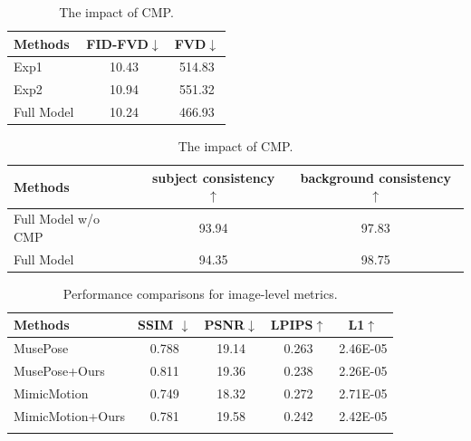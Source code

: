\begin{table}[t]
\footnotesize
\begin{minipage}[t]{0.33\textwidth}
\centering
\setlength{\tabcolsep}{2pt}
\caption{The impact of hybrid ControlNet.}
\begin{tabular}{lcc}
\toprule
{Methods} & FID-FVD$\downarrow$   & FVD$\downarrow$\\ 
\midrule
Exp1 & 10.43 & 514.83 \\
Exp2 & 10.94 & 551.32 \\
Full Model & 10.24 & 466.93 \\
 \bottomrule
\end{tabular}
\label{tab:appendix_controlnet}
\end{minipage}
\hfill
\begin{minipage}[t]{0.65\textwidth}
\caption{The impact of CMP.}
\centering
\setlength{\tabcolsep}{2pt}
\begin{tabular}{lcc}
\toprule[1pt]
Methods  & subject consistency$\uparrow$ & background consistency$\uparrow$ \\
\midrule
Full Model w/o CMP & 93.94                  &   97.83\\            
Full Model         &94.35                  &  98.75   \\
\bottomrule
\end{tabular}
\label{tab:appendix_cmp}
\end{minipage}
\end{table}

\begin{table}[t]
\caption{Performance comparisons for image-level metrics.}
\centering
\begin{tabular}{lcccc}
\toprule
Methods  & SSIM $\downarrow$ & PSNR$\downarrow$ & LPIPS$\uparrow$  & L1$\uparrow$ \\
\midrule
MusePose &0.788& 19.14&  0.263&  2.46E-05\\     
MusePose+Ours  &0.811  &19.36  &0.238  &2.26E-05\\
\midrule
MimicMotion &0.749  &18.32  &0.272& 2.71E-05\\
MimicMotion+Ours & 0.781&19.58 &0.242&2.42E-05 \\
\bottomrule
\label{tab:appendix_exp}
\end{tabular}
\end{table}

